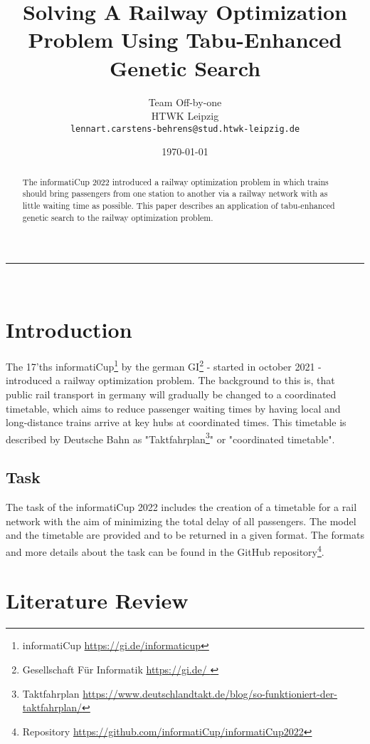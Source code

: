 \documentclass[a4paper,10pt,parskip]{article}
\title{Solving A Railway Optimization Problem Using Tabu-Enhanced Genetic Search}
\author{
    \Large Team Off-by-one \\ [2mm]
    \normasize HTWK Leipzig \\ \texttt{lennart.carstens-behrens@stud.htwk-leipzig.de}
}
\date{\today}
\begin{document}
\maketitle

\begin{abstract}
The informatiCup 2022 introduced a railway optimization problem in which trains 
should bring passengers from one station to another via a railway network with 
as little waiting time as possible. This paper describes an application of 
tabu-enhanced genetic search to the railway optimization problem.
\end{abstract}

\mbox{}\hrule\mbox{}\\

\section{Introduction}

The 17'ths informatiCup\footnote{informatiCup \url{https://gi.de/informaticup}} 
by the german GI\footnote{Gesellschaft Für Informatik \url{ https://gi.de/ }} - 
started in october 2021 - introduced a railway optimization problem. The 
background to this is, that public rail transport in germany will gradually be 
changed to a coordinated timetable, which aims to reduce passenger waiting times 
by having local and long-distance trains arrive at key hubs at coordinated times. 
This timetable is described by Deutsche Bahn as 
"Taktfahrplan\footnote{Taktfahrplan \url{https://www.deutschlandtakt.de/blog/so-funktioniert-der-taktfahrplan/}}" 
or "coordinated timetable".

\subsection{Task}

The task of the informatiCup 2022 includes the creation of a timetable for a rail 
network with the aim of minimizing the total delay of all passengers. The model 
and the timetable are provided and to be returned in a given format. The formats 
and more details about the task can be found in the GitHub 
repository\footnote{Repository \url{https://github.com/informatiCup/informatiCup2022}}.

\section{Literature Review}
\end{document}
